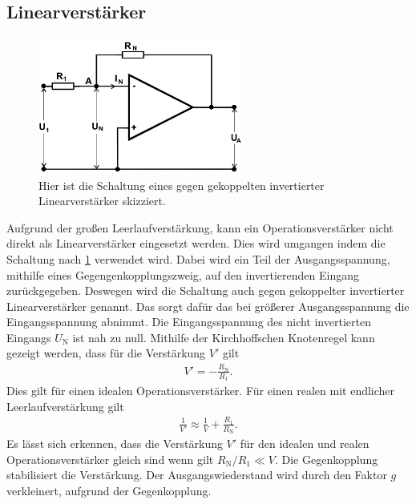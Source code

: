 \subsection{Linearverstärker}
\begin{figure}[h!]
	\centering
	\includegraphics[width = 0.6\textwidth]{../Grafiken/Gegengekoppelter_Invertierter_Liniearverstaerker.png}
	\caption{Hier ist die Schaltung eines gegen gekoppelten invertierter Linearverstärker skizziert. \cite{V51}\label{fig:gegen_gekoppelter_invertierter_Linarverstärker}}
\end{figure}
Aufgrund der großen Leerlaufverstärkung, kann ein Operationsverstärker nicht direkt als Linearverstärker eingesetzt werden.
Dies wird umgangen indem die Schaltung nach \cref{fig:gegen_gekoppelter_invertierter_Linarverstärker} verwendet wird.
Dabei wird ein Teil der Ausgangsspannung, mithilfe eines Gegengenkopplungszweig, auf den invertierenden Eingang zurückgegeben.
Deswegen wird die Schaltung auch gegen gekoppelter invertierter Linearverstärker genannt.
Das sorgt dafür das bei größerer Ausgangsspannung die Eingangsspannung abnimmt.
Die Eingangsspannung des nicht invertierten Eingangs $U_\text{N}$ ist nah zu null.
Mithilfe der Kirchhoffschen Knotenregel kann gezeigt werden, dass für die Verstärkung $V'$ gilt
\begin{align}
	V' = -\frac{R_\text{N}}{R_1}.
	\label{eq:gegengekoppelt_verstaerkung}
\end{align}
Dies gilt für einen idealen Operationsverstärker.
Für einen realen mit endlicher Leerlaufverstärkung gilt 
\begin{align}
	\frac{1}{V'}\approx\frac{1}{V}+\frac{R_1}{R_\text{N}}.
	\label{eq:leerlauf_verstaerkung}
\end{align}
Es lässt sich erkennen, dass die Verstärkung $V'$ für den idealen und realen Operationsverstärker gleich sind wenn gilt $R_\text{N}/R_1\ll V$.
Die Gegenkopplung stabilisiert die Verstärkung.
Der Ausgangswiederstand wird durch den Faktor $g$ verkleinert, aufgrund der Gegenkopplung.
